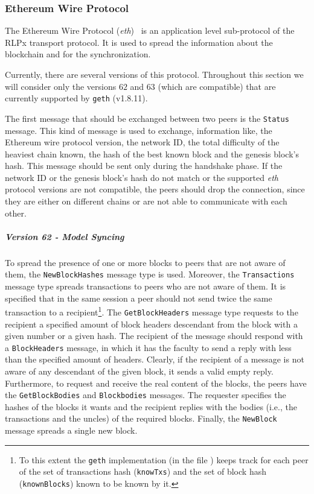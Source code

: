 \subsubsection{Ethereum Wire Protocol}
\label{sec:ethereum-wire-protocol}

The Ethereum Wire Protocol (\emph{eth})~\cite{bib:ethereumwireprotocol}  is an
application level sub-protocol of the RLPx transport protocol. It is used to
spread the information about the blockchain and for the synchronization.

Currently, there are several versions of this protocol. Throughout
this  section we will consider only the versions $62$ and $63$ (which are
compatible) that are currently supported by
\texttt{geth} (v1.8.11).

The first message that should be exchanged between two peers is the
\texttt{Status} message. This kind of message is used to exchange, information
like, the Ethereum wire protocol version, the network ID, the total difficulty
of the  heaviest chain known, the hash of the best known block and the genesis
block's hash. This message should be sent only during the handshake phase. If
the  network ID or the genesis block's hash do not match or the supported
\emph{eth} protocol versions are not compatible, the peers should drop the
connection, since they are either on different chains or are not able to
communicate with each other.

\subparagraph{Version 62 - Model Syncing}
To spread the presence of one or more blocks to peers that are not aware of
them, the \texttt{NewBlockHashes} message type is used. Moreover, the
\texttt{Transactions} message type spreads transactions to peers who are not
aware of them. It is specified that in the same session a peer should not send
twice the same transaction to a recipient\footnote{To this extent the
\texttt{geth} implementation (in the file ) keeps track for
each peer of the set of transactions hash (\texttt{knowTxs}) and the set of
block hash (\texttt{knownBlocks}) known to be known by it.}.
The \texttt{GetBlockHeaders} message type requests to the recipient a specified
amount of block headers descendant from the block with a given number or a
given hash. The recipient of the message should respond with a
\texttt{BlockHeaders} message, in which it has the faculty to send a reply with
less than the specified amount of headers. Clearly, if the recipient of a
message is not aware of any descendant of the given block, it sends a valid
empty reply. Furthermore, to request and receive the real content of the
blocks, the peers have the \texttt{GetBlockBodies} and \texttt{Blockbodies}
messages. The requester specifies the hashes of the blocks it wants and the
recipient replies with the bodies (i.e., the transactions and the uncles) of
the required blocks. Finally, the \texttt{NewBlock} message spreads a single
new block.

